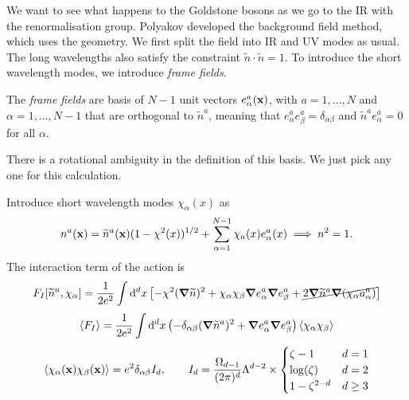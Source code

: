 We want to see what happens to the Goldstone bosons as we go to the IR with the renormalisation group.
Polyakov developed the background field method, which uses the geometry.
We first split the field into IR and UV modes as usual. The long wavelengths also satisfy the constraint $\widetilde{n} \cdot \widetilde{n} = 1$.
To introduce the short wavelength modes, we introduce \emph{frame fields}.
\begin{definition}[]
  The \emph{frame fields} are basis of $N-1$ unit vectors $e^{a}_{\alpha} (\vb{x})$, with $a = 1, \dots, N$ and $\alpha = 1, \dots, N-1$ that are orthogonal to $\widetilde{n} ^{a}$, meaning that $e^{a}_{\alpha} e^{a}_{\beta} = \delta_{\alpha\beta}$ and $\widetilde{n} ^{a} e^{a}_{\alpha} = 0$ for all $\alpha$.
\end{definition}
\begin{leftbar}
  \begin{remark}
    There is a rotational ambiguity in the definition of this basis. We just pick any one for this calculation.
  \end{remark}
\end{leftbar}
Introduce short wavelength modes $\chi_{\alpha}(x)$ as
\begin{equation}
  n^{a}(\vb{x}) = \widetilde{n} ^{a}(\vb{x}) (1 - \chi^2(x))^{1/2}
  + \sum_{\alpha = 1}^{N -1} \chi_{a}(x) e^{a}_{\alpha}(x) \implies n^2 = 1.
\end{equation}
The interaction term of the action is
\begin{equation}
  F_I[\widetilde{n}^{a}, \chi_{\alpha}] = \frac{1}{2e^2} \int \dd[d]{x} \left[ -\chi^2 (\grad \widetilde{n})^2 + \chi_{\alpha} \chi_{\beta} \grad e^{a}_{\alpha} \grad e^{a}_{\beta} + \cancel{2\grad \widetilde{n}^{a} \grad(\chi_{\alpha} a^{a}_{\alpha})} \right]
\end{equation}
\begin{equation}
  \langle F_I \rangle = \frac{1}{2e^2} \int \dd[d]{x} \left( -\delta_{\alpha\beta} (\grad \widetilde{n}^{a})^2 + \grad e^{a}_{\alpha} \grad e^{a}_{\beta} \right) \langle \chi_{\alpha} \chi_{\beta} \rangle
\end{equation}
\begin{equation}
  \langle \chi_{\alpha}(\vb{x}) \chi_{\beta}(\vb{x}) \rangle = e^2 \delta_{\alpha\beta} I_{d}, \qquad
  I_{d} = \frac{\Omega_{d-1}}{(2\pi)^{d}} \Lambda^{d-2} \times
  \begin{cases}
    \zeta-1 & d=1 \\
    \log(\zeta) & d = 2 \\
    1 - \zeta^{2-d} & d \geq 3
  \end{cases}
\end{equation}
